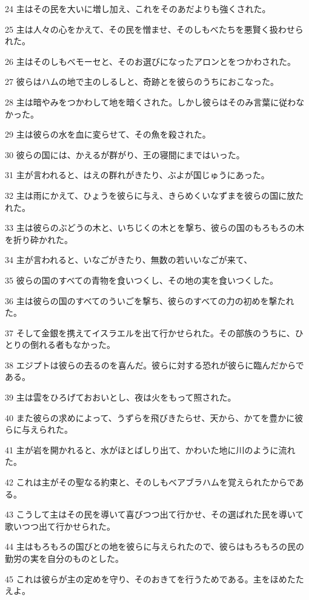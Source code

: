 \par 24 主はその民を大いに増し加え、これをそのあだよりも強くされた。
\par 25 主は人々の心をかえて、その民を憎ませ、そのしもべたちを悪賢く扱わせられた。
\par 26 主はそのしもべモーセと、そのお選びになったアロンとをつかわされた。
\par 27 彼らはハムの地で主のしるしと、奇跡とを彼らのうちにおこなった。
\par 28 主は暗やみをつかわして地を暗くされた。しかし彼らはそのみ言葉に従わなかった。
\par 29 主は彼らの水を血に変らせて、その魚を殺された。
\par 30 彼らの国には、かえるが群がり、王の寝間にまではいった。
\par 31 主が言われると、はえの群れがきたり、ぶよが国じゅうにあった。
\par 32 主は雨にかえて、ひょうを彼らに与え、きらめくいなずまを彼らの国に放たれた。
\par 33 主は彼らのぶどうの木と、いちじくの木とを撃ち、彼らの国のもろもろの木を折り砕かれた。
\par 34 主が言われると、いなごがきたり、無数の若いいなごが来て、
\par 35 彼らの国のすべての青物を食いつくし、その地の実を食いつくした。
\par 36 主は彼らの国のすべてのういごを撃ち、彼らのすべての力の初めを撃たれた。
\par 37 そして金銀を携えてイスラエルを出て行かせられた。その部族のうちに、ひとりの倒れる者もなかった。
\par 38 エジプトは彼らの去るのを喜んだ。彼らに対する恐れが彼らに臨んだからである。
\par 39 主は雲をひろげておおいとし、夜は火をもって照された。
\par 40 また彼らの求めによって、うずらを飛びきたらせ、天から、かてを豊かに彼らに与えられた。
\par 41 主が岩を開かれると、水がほとばしり出て、かわいた地に川のように流れた。
\par 42 これは主がその聖なる約束と、そのしもべアブラハムを覚えられたからである。
\par 43 こうして主はその民を導いて喜びつつ出て行かせ、その選ばれた民を導いて歌いつつ出て行かせられた。
\par 44 主はもろもろの国びとの地を彼らに与えられたので、彼らはもろもろの民の勤労の実を自分のものとした。
\par 45 これは彼らが主の定めを守り、そのおきてを行うためである。主をほめたたえよ。

